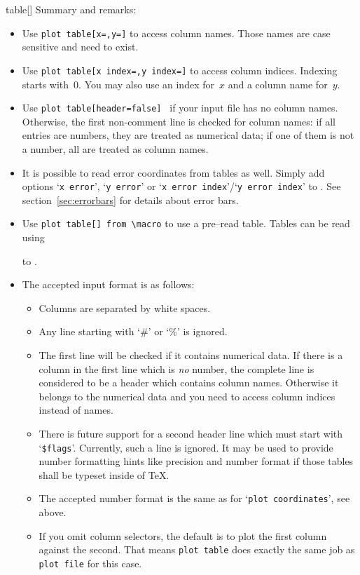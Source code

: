 \begin{addplotoperation}[noindex]{table}{[]}
Summary and remarks:
\begin{itemize}
	\item Use \texttt{plot table[x=,y=]} to access column names. Those names are case sensitive and need to exist.
	\item Use \texttt{plot table[x index=,y index=]} to access column indices. Indexing starts with~$0$. You may also use an index for~$x$ and a column name for~$y$.
	\item Use \texttt{plot table[header=false] } if your input file has no column names. Otherwise, the first non-comment line is checked for column names: if all entries are numbers, they are treated as numerical data; if one of them is not a number, all are treated as column names.
	\item It is possible to read error coordinates from tables as well. Simply add options `\texttt{x error}', `\texttt{y error}' or `\texttt{x error index}'/`\texttt{y error index}' to . See section~\ref{sec:errorbars} for details about error bars.
	\item Use \texttt{plot table[] from \textbackslash macro} to use a pre--read table. Tables can be read using
\begin{codeexample}
 to \macroname.
\end{codeexample}
	\item The accepted input format is as follows:
		\begin{itemize}
			\item Columns are separated by white spaces.
			\item Any line starting with `\#' or `\%' is ignored.
			\item The first line will be checked if it contains numerical data. If there is a column in the first line which is \emph{no} number, the complete line is considered to be a header which contains column names. Otherwise it belongs to the numerical data and you need to access column indices instead of names.

			\item There is future support for a second header line which must start with `\texttt{\$flags}'. Currently, such a line is ignored. It may be used to provide number formatting hints like precision and number format if those tables shall be typeset inside of \TeX.
			\item The accepted number format is the same as for `\texttt{plot coordinates}', see above.
			\item If you omit column selectors, the default is to plot the first column against the second. That means \texttt{plot table} does exactly the same job as \texttt{plot file} for this case.
		\end{itemize}
\end{itemize}
\end{addplotoperation}


